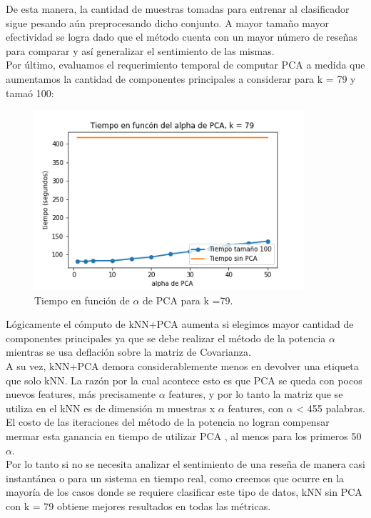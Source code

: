 De esta manera, la cantidad de muestras tomadas para entrenar al clasificador sigue pesando aún preprocesando dicho conjunto. A mayor tamaño mayor efectividad se logra dado que el método cuenta con un mayor número de reseñas para comparar y así generalizar el sentimiento de las mismas. \\

Por último, evaluamos el requerimiento temporal de computar PCA a medida que aumentamos la cantidad de componentes principales a considerar para k = 79 y tamaó 100: \\

\begin{figure}[H]
     \begin{center}
     \includegraphics[width=100mm]{img/pca_tiempo_79_100.png} 
    \end{center}
\caption{Tiempo en función de $\alpha$ de PCA para k =79.} \label{fig:exp5-tiempo-knn}
\end{figure}

Lógicamente el cómputo de kNN+PCA aumenta si elegimos mayor cantidad de componentes principales ya que se debe realizar el método de la potencia $\alpha$ mientras se usa deflación sobre la matriz de Covarianza.\\

A su vez, kNN+PCA demora considerablemente menos en devolver una etiqueta que solo kNN. La razón por la cual acontece esto es que PCA se queda con pocos nuevos features, más precisamente $\alpha$ features, y por lo tanto la matriz que se utiliza en el kNN es de dimensión m muestras x $\alpha$ features, con $\alpha$ < 455 palabras. El costo de las iteraciones del método de la potencia no logran compensar mermar esta ganancia en tiempo de utilizar PCA , al menos para los primeros 50 $\alpha$. \\

Por lo tanto si no se necesita analizar el sentimiento de una reseña de manera casi instantánea o para un sistema en tiempo real, como creemos que ocurre en la mayoría de los casos donde se requiere clasificar este tipo de datos, kNN sin PCA con k = 79 obtiene mejores resultados en todas las métricas. \\
